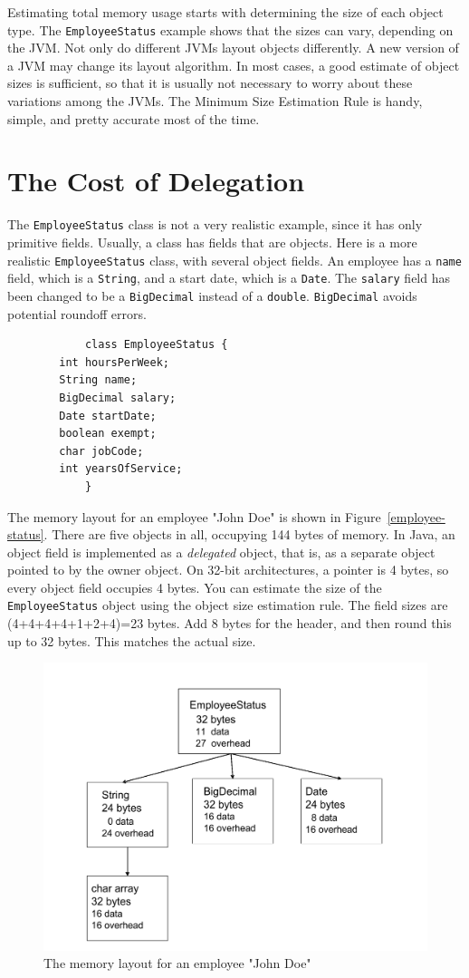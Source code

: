 \documentclass{book}
\theoremstyle{definition}
\begin{document}
Estimating total memory usage starts with determining the size of each object type. The \texttt{EmployeeStatus} example shows that the sizes can vary, depending on the JVM. Not only do different JVMs layout objects differently. A new version of a JVM may change its layout algorithm. In most cases, a good estimate of object sizes is sufficient, so that it is usually not necessary to worry about these variations among the JVMs. The Minimum Size Estimation Rule is handy, simple, and pretty accurate most of the time.

\section{The Cost of Delegation}


The \texttt{EmployeeStatus} class is not a very realistic example, since it has only primitive fields. Usually, a class has fields that are objects. Here is a more realistic \texttt{EmployeeStatus} class, with several object fields. An employee has a \texttt{name} field, which is a \texttt{String}, and a start date, which is a \texttt{Date}. The \texttt{salary} field has been changed to be a \texttt{BigDecimal} instead of a \texttt{double}. \texttt{BigDecimal} avoids potential roundoff errors.
\ttfamily
\begin{verbatim} 
			class EmployeeStatus {
        int hoursPerWeek;
        String name;
        BigDecimal salary;
        Date startDate;
        boolean exempt;
        char jobCode;
        int yearsOfService;
			}
\end{verbatim}
\normalfont
The memory layout for an employee "John Doe" is shown in Figure~\ref{employee-status}. There are five objects in all, occupying 144 bytes of memory. 
In Java, an object field is implemented as a \textit{delegated} object, that is, as a separate object pointed to by the owner object.  On 32-bit architectures, a pointer is 4 bytes, so every object field occupies 4 bytes. You can estimate the size of the \texttt{EmployeeStatus} object using the object size estimation rule.  The field sizes are (4+4+4+4+1+2+4)=23 bytes. Add 8 bytes for the header, and then round this up to 32 bytes. This matches the actual size.

\begin{figure}
  \centering
 \includegraphics[width=.60\textwidth]{Figures/chapter4/employee-status.pdf}
  \caption{The memory layout for an employee "John Doe"}
  \label{fig:employee-status}
\end{figure}
\end{document}
